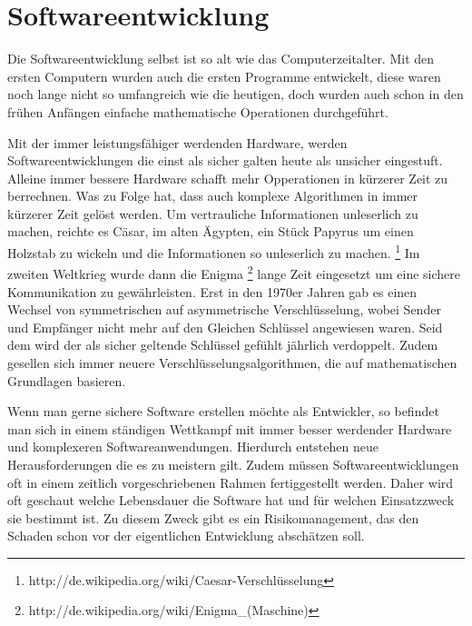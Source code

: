 \section{Softwareentwicklung}\label{entwicklung}

Die Softwareentwicklung selbst ist so alt wie das Computerzeitalter. 
Mit den ersten Computern wurden auch die ersten Programme entwickelt,
diese waren noch lange nicht so umfangreich wie die heutigen, doch wurden
auch schon in den frühen Anfängen einfache mathematische Operationen durchgeführt. 

Mit der immer leistungsfähiger werdenden Hardware, werden Softwareentwicklungen
die einst als sicher galten heute als unsicher eingestuft. Alleine immer
bessere Hardware schafft mehr Opperationen in kürzerer Zeit zu berrechnen.
Was zu Folge hat, dass auch komplexe Algorithmen in immer kürzerer Zeit
gelöst werden.  
Um vertrauliche Informationen unleserlich zu machen, reichte es Cäsar, 
im alten Ägypten, ein Stück Papyrus um einen Holzstab zu wickeln und
die Informationen so unleserlich zu machen. 
\footnote[1]{http://de.wikipedia.org/wiki/Caesar-Verschlüsselung} 
Im zweiten Weltkrieg wurde dann die Enigma \footnote[2]{http://de.wikipedia.org/wiki/Enigma_(Maschine)} 
lange Zeit eingesetzt um eine sichere Kommunikation zu gewährleisten. 
Erst in den 1970er Jahren gab es einen Wechsel von symmetrischen auf 
asymmetrische Verschlüsselung, wobei Sender und Empfänger nicht mehr auf 
den Gleichen Schlüssel angewiesen waren. Seid dem wird der als sicher
geltende Schlüssel gefühlt jährlich verdoppelt. Zudem gesellen sich immer
neuere Verschlüsselungsalgorithmen, die auf mathematischen Grundlagen basieren. 

Wenn man gerne sichere Software erstellen möchte als Entwickler, so 
befindet man sich in einem ständigen Wettkampf mit immer besser werdender 
Hardware und komplexeren Softwareanwendungen. Hierdurch entstehen neue 
Herausforderungen die es zu meistern gilt. 
Zudem müssen Softwareentwicklungen oft in einem zeitlich vorgeschriebenen 
Rahmen fertiggestellt werden. Daher wird oft geschaut welche Lebensdauer 
die Software hat und für welchen Einsatzzweck sie bestimmt ist. Zu diesem 
Zweck gibt es ein Risikomanagement, das den Schaden schon vor der eigentlichen
Entwicklung abschätzen soll.

